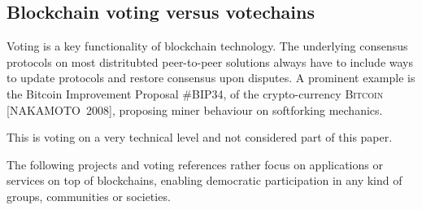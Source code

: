 \documentclass[9pt,oneside]{amsart}
\begin{document}
\begin{multicols}{2}
\subsection{Blockchain voting versus votechains}
Voting is a key functionality of blockchain technology. The underlying consensus protocols on most distritubted peer-to-peer solutions always have to include ways to update protocols and restore consensus upon disputes. A prominent example is the Bitcoin Improvement Proposal \#BIP34, of the crypto-currency \textsc{Bitcoin} [NAKAMOTO~2008], proposing miner behaviour on softforking mechanics.\par
This is voting on a very technical level and not considered part of this paper.\par
The following projects and voting references rather focus on applications or services on top of blockchains, enabling democratic participation in any kind of groups, communities or societies.


\end{multicols}
\end{document}
